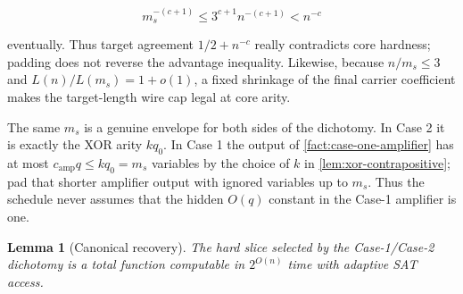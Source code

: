 \documentclass[11pt,letterpaper]{article}
\newcommand{\cref}[1]{\ref{#1}}
\newtheorem{lemma}[theorem]{Lemma}
\theoremstyle{definition}
\theoremstyle{remark}
\begin{document}
\[
m_s^{-(c+1)}
\le
3^{c+1}n^{-(c+1)}
<n^{-c}
\]

eventually. Thus target agreement \(1/2+n^{-c}\) really contradicts core
hardness; padding does not reverse the advantage inequality. Likewise,
because \(n/m_s\le3\) and \(L(n)/L(m_s)=1+o(1)\), a fixed shrinkage of
the final carrier coefficient makes the target-length wire cap legal at
core arity.

The same \(m_s\) is a genuine envelope for both sides of the dichotomy.
In Case 2 it is exactly the XOR arity \(kq_0\). In Case 1 the output of
\cref{fact:case-one-amplifier} has at most \(c_{\mathrm{amp}}q\le kq_0=m_s\) variables by
the choice of \(k\) in \cref{lem:xor-contrapositive}; pad that shorter amplifier output
with ignored variables up to \(m_s\). Thus the schedule never assumes
that the hidden \(O(q)\) constant in the Case-1 amplifier is one.

\begin{lemma}[Canonical recovery]
\label{lem:canonical-recovery}
The hard slice selected by
the Case-1/Case-2 dichotomy is a total function computable in
\(2^{O(n)}\) time with adaptive SAT access.
\end{lemma}
\end{document}
